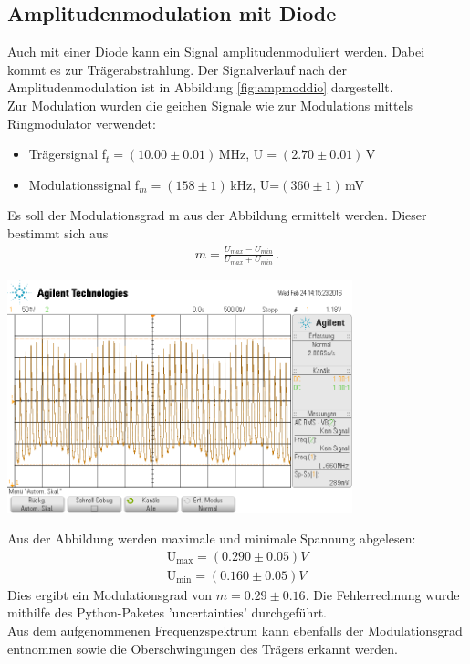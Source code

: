 \documentclass[]{scrartcl}
\begin{document}
\subsection{Amplitudenmodulation mit Diode}
Auch mit einer Diode kann ein Signal amplitudenmoduliert werden. Dabei kommt es zur Trägerabstrahlung. Der Signalverlauf nach der Amplitudenmodulation ist in Abbildung \ref{fig:ampmoddio} dargestellt. \\
Zur Modulation wurden die geichen Signale wie zur Modulations mittels Ringmodulator verwendet:
\begin{itemize}
		\item Trägersignal f$_t=(10.00\pm0.01)$\,MHz, U$=(2.70\pm0.01)$\,V
		\item Modulationssignal f$_m=(158\pm1)$\,kHz, U=$(360\pm1)$\,mV
\end{itemize}
Es soll der Modulationsgrad m aus der Abbildung ermittelt werden. Dieser bestimmt sich aus
\begin{align}
m=\frac{U_{max}-U_{min}}{U_{max}+U_{min}}\,.
\label{eq:modgrad}
\end{align}
\begin{center}
	\includegraphics[width=10cm]{images/ampmoddio.png}
	\label{fig:ampmoddio}
\end{center}
Aus der Abbildung werden maximale und minimale Spannung abgelesen:
\begin{align*}
\text{U}_{\text{max}}=(0.290\pm 0.05)\si{V} \\
\text{U}_{\text{min}}=(0.160\pm 0.05)\si{V}
\end{align*}
Dies ergibt ein Modulationsgrad von $m=0.29\pm0.16$. Die Fehlerrechnung wurde mithilfe des Python-Paketes 'uncertainties' durchgeführt. \\
Aus dem aufgenommenen Frequenzspektrum kann ebenfalls der Modulationsgrad entnommen sowie die Oberschwingungen des Trägers erkannt werden. \\
\end{document}

